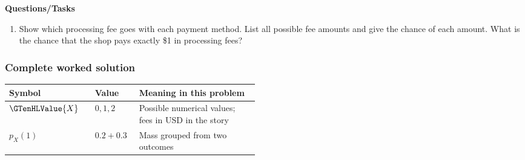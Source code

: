 \textbf{Questions/Tasks}
\begin{enumerate}
\item Show which processing fee goes with each payment method. List all possible fee amounts and give the chance of each amount. What is the chance that the shop pays exactly \$1 in processing fees?
\end{enumerate}
\subsubsection*{Complete worked solution}
\begin{center}
\begin{tabular}{llp{0.48\linewidth}}
\toprule
Symbol & Value & Meaning in this problem \\ \midrule
$\GTenHLValue{X}$ & $0,1,2$ & Possible numerical values; fees in USD in the story \\
$p_X(1)$ & $0.2+0.3$ & Mass grouped from two outcomes \\
\bottomrule
\end{tabular}
\end{center}

